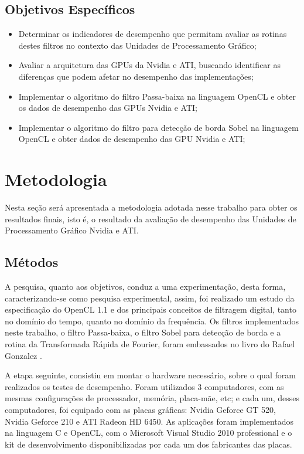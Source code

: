\subsection{Objetivos Específicos}
\begin{itemize}
\item Determinar os indicadores de desempenho que permitam avaliar as rotinas destes filtros no contexto das Unidades de Processamento Gráfico;\\

\item Avaliar a arquitetura das GPUs da Nvidia e ATI, buscando identificar as diferenças que podem afetar no desempenho das implementações;\\

\item Implementar o algoritmo do filtro Passa-baixa na linguagem OpenCL e obter os dados de desempenho das GPUs Nvidia e ATI;\\

\item Implementar o algoritmo do filtro para detecção de borda Sobel na linguagem OpenCL e obter dados de desempenho das GPU Nvidia e ATI;\\
\end{itemize}
\section{Metodologia}
Nesta seção será apresentada a metodologia adotada nesse trabalho para obter os resultados finais, isto é, o resultado da avaliação de desempenho das Unidades de Processamento Gráfico Nvidia e ATI.
\subsection{Métodos}
A pesquisa, quanto aos objetivos, conduz a uma experimentação, desta forma, caracterizando-se como pesquisa experimental, assim, foi realizado um estudo da especificação do OpenCL 1.1 \cite{opencl08} e dos principais conceitos de filtragem digital, tanto no domínio do tempo, quanto no domínio da frequência. Os filtros implementados neste trabalho, o filtro Passa-baixa, o filtro Sobel para detecção de borda e a rotina da Transformada Rápida de Fourier, foram embassados no livro do Rafael Gonzalez \cite{Gonzalez:2006:DIP:1076432}.

A etapa seguinte, consistiu em montar o hardware necessário, sobre o qual foram realizados os testes de desempenho. Foram utilizados 3 computadores, com as mesmas configurações de processador, memória, placa-mãe, etc; e cada um, desses computadores, foi equipado com as placas gráficas: Nvidia Geforce GT 520, Nvidia Geforce 210 e ATI Radeon HD 6450. As aplicações foram implementados na linguagem C e OpenCL, com o Microsoft Visual Studio 2010 professional e o kit de desenvolvimento disponibilizadas por cada um dos fabricantes das placas.
